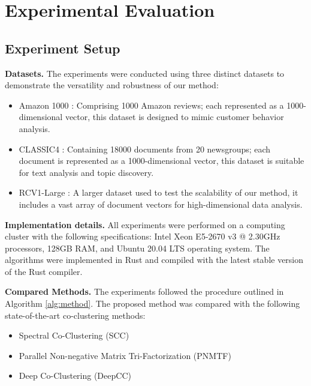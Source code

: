 \documentclass[letterpaper, 10 pt, conference]{ieeeconf}  %
\begin{document}

\section{Experimental Evaluation}
\label{sec:experiment}
\subsection{Experiment Setup}

\textbf{Datasets.}
The experiments were conducted using three distinct datasets to demonstrate the versatility and robustness of our method:

\begin{itemize}
    \item Amazon 1000 \cite{ni2019justifying}: Comprising 1000 Amazon reviews; each represented as a 1000-dimensional vector, this dataset is designed to mimic customer behavior analysis.
    \item CLASSIC4 \cite{reddy2021weclustering}: Containing 18000 documents from 20 newsgroups; each document is represented as a 1000-dimensional vector, this dataset is suitable for text analysis and topic discovery.
    \item RCV1-Large \cite{lewis2004rcv1}: A larger dataset used to test the scalability of our method, it includes a vast array of document vectors for high-dimensional data analysis.
\end{itemize}

\textbf{Implementation details.}
All experiments were performed on a computing cluster with the following specifications: Intel Xeon E5-2670 v3 @ 2.30GHz processors, 128GB RAM, and Ubuntu 20.04 LTS operating system. The algorithms were implemented in Rust and compiled with the latest stable version of the Rust compiler.

\textbf{Compared Methods.}
The experiments followed the procedure outlined in Algorithm \ref{alg:method}. The proposed method was compared with the following state-of-the-art co-clustering methods:

\begin{itemize}
    \item Spectral Co-Clustering (SCC) \cite{dhillon2001CoclusteringDocumentsWords}
    \item Parallel Non-negative Matrix Tri-Factorization (PNMTF)\cite{chen2023ParallelNonNegativeMatrix}
    \item Deep Co-Clustering (DeepCC) \cite{dongkuanxu2019DeepCoClustering}
\end{itemize}
\end{document}

